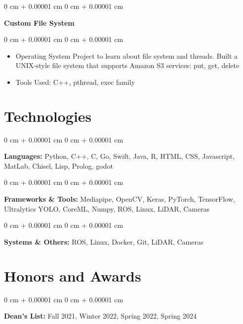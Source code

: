 \documentclass[10pt, letterpaper]{article}
\newenvironment{highlights}{
    \begin{itemize}[
        topsep=0.10 cm,
        parsep=0.10 cm,
        partopsep=0pt,
        itemsep=0pt,
        leftmargin=0 cm + 10pt
    ]
}{
    \end{itemize}
} %
\newenvironment{onecolentry}{
    \begin{adjustwidth}{
        0 cm + 0.00001 cm
    }{
        0 cm + 0.00001 cm
    }
}{
    \end{adjustwidth}
} %
\newenvironment{twocolentry}[2][]{
    \onecolentry
    \def\secondColumn{#2}
    \setcolumnwidth{\fill, 6 cm}
    \begin{paracol}{2}
}{
    \switchcolumn \raggedleft \secondColumn
    \end{paracol}
    \endonecolentry
} %
\begin{document}
        \begin{twocolentry}{
            2023
        }
            \textbf{Custom File System}\end{twocolentry}

        \vspace{0.10 cm}
        \begin{onecolentry}
            \begin{highlights}
                \item Operating System Project to learn about file system and threads. Built a UNIX-style file system that supports Amazon S3 services: put, get, delete
                \item Tools Used: C++, pthread, exec family
            \end{highlights}
        \end{onecolentry}



    
    \section{Technologies}



        
        \begin{onecolentry}
            \textbf{Languages:} Python, C++, C, Go, Swift, Java, R, HTML, CSS, Javascript, MatLab, Chisel, Lisp, Prolog, godot 
        \end{onecolentry}

        \vspace{0.2 cm}

        \begin{onecolentry}
            \textbf{Frameworks \& Tools:} Mediapipe, OpenCV, Keras, PyTorch, TensorFlow, Ultralytics YOLO, CoreML, Numpy, ROS, Linux, LiDAR, Cameras 
        \end{onecolentry}

        \vspace{0.2 cm}

        \begin{onecolentry}
            \textbf{Systems \& Others:} ROS, Linux, Docker, Git, LiDAR, Cameras 
        \end{onecolentry}

    \section{Honors and Awards}
        \begin{onecolentry}
            \textbf{Dean's List: } Fall 2021, Winter 2022, Spring 2022, Spring 2024
        \end{onecolentry}


    
\end{document}
